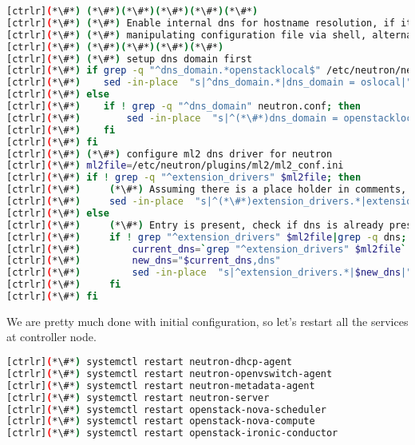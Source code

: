 \begin{lstlisting}[language=bash,keywords={}]
[ctrlr](*\#*) (*\#*)(*\#*)(*\#*)(*\#*)(*\#*)
[ctrlr](*\#*) (*\#*) Enable internal dns for hostname resolution, if it already not set
[ctrlr](*\#*) (*\#*) manipulating configuration file via shell, alternate is to use openstack-config (TODO)
[ctrlr](*\#*) (*\#*)(*\#*)(*\#*)(*\#*)
[ctrlr](*\#*) (*\#*) setup dns domain first
[ctrlr](*\#*) if grep -q "^dns_domain.*openstacklocal$" /etc/neutron/neutron.conf; then
[ctrlr](*\#*)    sed -in-place  "s|^dns_domain.*|dns_domain = oslocal|" /etc/neutron/neutron.conf
[ctrlr](*\#*) else
[ctrlr](*\#*)    if ! grep -q "^dns_domain" neutron.conf; then
[ctrlr](*\#*)        sed -in-place  "s|^(*\#*)dns_domain = openstacklocal$|dns_domain = oslocal|" /etc/neutron/neutron.conf
[ctrlr](*\#*)    fi
[ctrlr](*\#*) fi
[ctrlr](*\#*) (*\#*) configure ml2 dns driver for neutron
[ctrlr](*\#*) ml2file=/etc/neutron/plugins/ml2/ml2_conf.ini
[ctrlr](*\#*) if ! grep -q "^extension_drivers" $ml2file; then
[ctrlr](*\#*)     (*\#*) Assuming there is a place holder in comments, replace that string
[ctrlr](*\#*)     sed -in-place  "s|^(*\#*)extension_drivers.*|extension_drivers = port_security,dns|" $ml2file
[ctrlr](*\#*) else
[ctrlr](*\#*)     (*\#*) Entry is present, check if dns is already present, if not then enable
[ctrlr](*\#*)     if ! grep "^extension_drivers" $ml2file|grep -q dns; then
[ctrlr](*\#*)         current_dns=`grep "^extension_drivers" $ml2file`
[ctrlr](*\#*)         new_dns="$current_dns,dns"
[ctrlr](*\#*)         sed -in-place  "s|^extension_drivers.*|$new_dns|" $ml2file
[ctrlr](*\#*)     fi
[ctrlr](*\#*) fi
\end{lstlisting}

We are pretty much done with initial configuration, so let’s restart all the services at controller node.

\begin{lstlisting}[language=bash,keywords={}]
[ctrlr](*\#*) systemctl restart neutron-dhcp-agent
[ctrlr](*\#*) systemctl restart neutron-openvswitch-agent
[ctrlr](*\#*) systemctl restart neutron-metadata-agent
[ctrlr](*\#*) systemctl restart neutron-server
[ctrlr](*\#*) systemctl restart openstack-nova-scheduler
[ctrlr](*\#*) systemctl restart openstack-nova-compute
[ctrlr](*\#*) systemctl restart openstack-ironic-conductor
\end{lstlisting}

